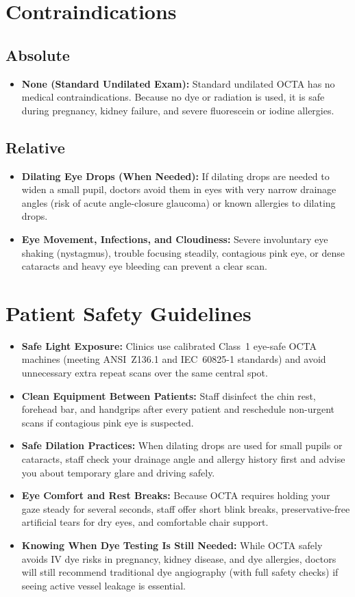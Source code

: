 \section{Contraindications}

\subsection{Absolute}
\begin{itemize}
\item \textbf{None (Standard Undilated Exam):} Standard undilated OCTA has no medical contraindications. Because no dye or radiation is used, it is safe during pregnancy, kidney failure, and severe fluorescein or iodine allergies.
\end{itemize}

\subsection{Relative}
\begin{itemize}
\item \textbf{Dilating Eye Drops (When Needed):} If dilating drops are needed to widen a small pupil, doctors avoid them in eyes with very narrow drainage angles (risk of acute angle-closure glaucoma) or known allergies to dilating drops.
\item \textbf{Eye Movement, Infections, and Cloudiness:} Severe involuntary eye shaking (nystagmus), trouble focusing steadily, contagious pink eye, or dense cataracts and heavy eye bleeding can prevent a clear scan.
\end{itemize}

\section{Patient Safety Guidelines}
\begin{itemize}
\item \textbf{Safe Light Exposure:} Clinics use calibrated Class~1 eye-safe OCTA machines (meeting ANSI~Z136.1 and IEC~60825-1 standards) and avoid unnecessary extra repeat scans over the same central spot.
\item \textbf{Clean Equipment Between Patients:} Staff disinfect the chin rest, forehead bar, and handgrips after every patient and reschedule non-urgent scans if contagious pink eye is suspected.
\item \textbf{Safe Dilation Practices:} When dilating drops are used for small pupils or cataracts, staff check your drainage angle and allergy history first and advise you about temporary glare and driving safely.
\item \textbf{Eye Comfort and Rest Breaks:} Because OCTA requires holding your gaze steady for several seconds, staff offer short blink breaks, preservative-free artificial tears for dry eyes, and comfortable chair support.
\item \textbf{Knowing When Dye Testing Is Still Needed:} While OCTA safely avoids IV dye risks in pregnancy, kidney disease, and dye allergies, doctors will still recommend traditional dye angiography (with full safety checks) if seeing active vessel leakage is essential.
\end{itemize}

